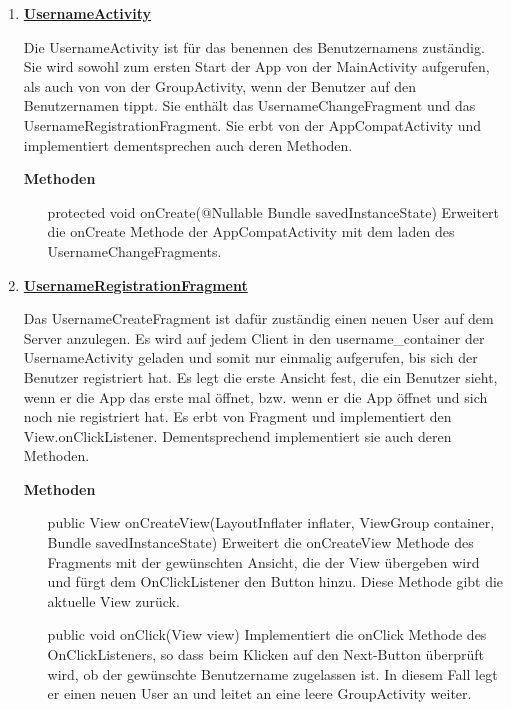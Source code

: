 \begin{enumerate}
	\item \textbf{\underline{UsernameActivity}}
	
	Die UsernameActivity ist für das benennen des Benutzernamens zuständig. Sie wird sowohl zum ersten Start der App von der MainActivity aufgerufen, als auch von von der GroupActivity, wenn der Benutzer auf den Benutzernamen tippt. Sie enthält das UsernameChangeFragment und das UsernameRegistrationFragment. Sie erbt von der AppCompatActivity und implementiert dementsprechen auch deren Methoden.
	
	\textbf{Methoden}
	
	\begin{enumerate}
		\item[protected void onCreate(@Nullable Bundle savedInstanceState)]
		Erweitert die onCreate Methode der AppCompatActivity mit dem laden des UsernameChangeFragments.
	\end{enumerate}
	
	\item \textbf{\underline{UsernameRegistrationFragment}}
	
	Das UsernameCreateFragment ist dafür zuständig einen neuen User auf dem Server anzulegen. Es wird auf jedem Client in den username\_container der UsernameActivity geladen und somit nur einmalig aufgerufen, bis sich der Benutzer registriert hat. Es legt die erste Ansicht fest, die ein Benutzer sieht, wenn er die App das erste mal öffnet, bzw. wenn er die App öffnet und sich noch nie registriert hat. Es erbt von Fragment und implementiert den View.onClickListener. Dementsprechend implementiert sie auch deren Methoden.
	
	\textbf{Methoden}
	
	\begin{enumerate}
		\item[public View onCreateView(LayoutInflater inflater, ViewGroup container, Bundle savedInstanceState)]
		Erweitert die onCreateView Methode des Fragments mit der gewünschten Ansicht, die der View übergeben wird und fürgt dem OnClickListener den Button hinzu. Diese Methode gibt die aktuelle View zurück.
		\item[public void onClick(View view)]
		Implementiert die onClick Methode des OnClickListeners, so dass beim Klicken auf den Next-Button überprüft wird, ob der gewünschte Benutzername zugelassen ist. In diesem Fall legt er einen neuen User an und leitet an eine leere GroupActivity weiter.
	\end{enumerate}


\end{enumerate}
